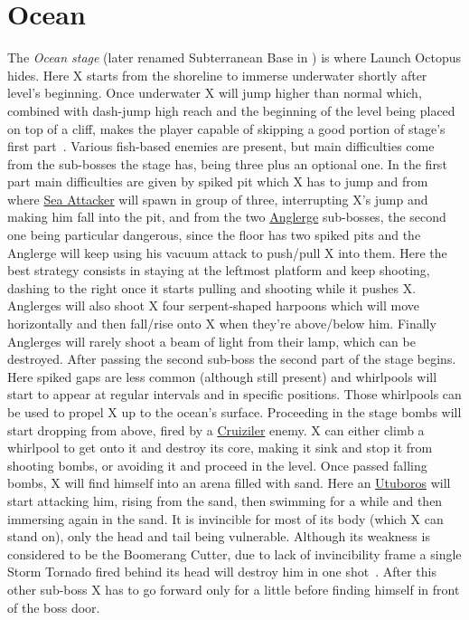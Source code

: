 \section{Ocean}
The \textit{Ocean stage} (later renamed Subterranean Base in \mhx) is where Launch Octopus hides. Here X starts from the shoreline to immerse underwater shortly after level's beginning. Once underwater X will jump higher than normal which, combined with dash-jump high reach and the beginning of the level being placed on top of a cliff, makes the player capable of skipping a good portion of stage's first part~\cite{stratwiki:Ocean}. Various fish-based enemies are present, but main difficulties come from the sub-bosses the stage has, being three plus an optional one. In the first part main difficulties are given by spiked pit which X has to jump and from where \hyperlink{enem:Sea_Attacker}{Sea Attacker} will spawn in group of three, interrupting X's jump and making him fall into the pit, and from the two \hyperlink{miniboss:Anglerge}{Anglerge} sub-bosses, the second one being particular dangerous, since the floor has two spiked pits and the Anglerge will keep using his vacuum attack to push/pull X into them. Here the best strategy consists in staying at the leftmost platform and keep shooting, dashing to the right once it starts pulling and shooting while it pushes X. Anglerges will also shoot X four serpent-shaped harpoons which will move horizontally and then fall/rise onto X when they're above/below him. Finally Anglerges will rarely shoot a beam of light from their lamp, which can be destroyed. After passing the second sub-boss the second part of the stage begins. Here spiked gaps are less common (although still present) and whirlpools will start to appear at regular intervals and in specific positions. Those whirlpools can be used to propel X up to the ocean's surface. Proceeding in the stage bombs will start dropping from above, fired by a \hyperlink{miniboss:Cruiziler}{Cruiziler} enemy. X can either climb a whirlpool to get onto it and destroy its core, making it sink and stop it from shooting bombs, or avoiding it and proceed in the level. Once passed falling bombs, X will find himself into an arena filled with sand. Here an \hyperlink{miniboss:Utuboros}{Utuboros} will start attacking him, rising from the sand, then swimming for a while and then immersing again in the sand. It is invincible for most of its body (which X can stand on), only the head and tail being vulnerable. Although its weakness is considered to be the Boomerang Cutter, due to lack of invincibility frame a single Storm Tornado fired behind its head will destroy him in one shot~\cite{wiki:Utuboros}. After this other sub-boss X has to go forward only for a little before finding himself in front of the boss door.


